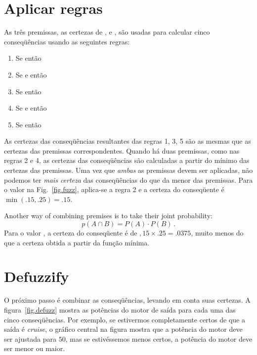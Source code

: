 \section{Aplicar regras}

As três premissas, as certezas de ,  e , são usadas para calcular cinco conseqüências usando as seguintes regras:

\begin{enumerate}
\item Se  então 
\item Se  e  então 
\item Se  então 
\item Se  e  então 
\item Se  então 
\end{enumerate}

As certezas das conseqüências resultantes das regras 1, 3, 5 são as mesmas que as certezas das premissas correspondentes. Quando há duas premissas, como nas regras 2 e 4, as certezas das conseqüências são calculadas a partir do mínimo das certezas das premissas. Uma vez que \emph{ambas} as premissas devem ser aplicadas, não podemos ter \emph{mais certeza} das conseqüências do que da menor das premissas. Para o valor  na Fig.~\ref{fig.fuzz}, aplica-se a regra 2 e a certeza do conseqüente é $\min(.15,.25)=.15$.

Another way of combining premises is to take their joint probability:
\[
p(A \cap B) = P(A)\cdot P(B)\,.
\]
Para o valor , a certeza do conseqüente é de $,15\times .25= .0375$, muito menos do que a certeza obtida a partir da função mínima.

\section{Defuzzify}

O próximo passo é combinar as conseqüências, levando em conta suas certezas. A figura~\ref{fig.defuzz} mostra as potências do motor de saída para cada uma das cinco conseqüências. Por exemplo, se estivermos completamente certos de que a saída é \emph{cruise}, o gráfico central na figura mostra que a potência do motor deve ser ajustada para $50$, mas se estivéssemos menos certos, a potência do motor deve ser menor ou maior.

